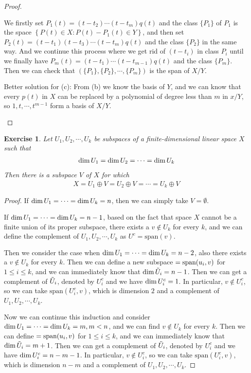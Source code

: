 \documentclass[10pt]{book}
\newtheorem{exercise}{Exercise}[section]
\theoremstyle{definition}
\numberwithin{equation}{chapter}
\begin{document}
\begin{proof}
\begin{enumerate}[label=(\alph*)]
    We firstly set $P_1(t) = (t-t_2)\cdots(t-t_m)q(t)$ and the class $\{P_1\}$ of $P_1$ is the space $\left\{P(t)\in X: P(t) - P_1(t) \in Y \right\}$, and then set $P_2(t) = (t-t_1)(t-t_3)\cdots(t-t_m)q(t)$ and the class $\{P_2 \}$ in the same way. And we continue this process where we get rid of $(t-t_i)$ in class $P_i$ until we finally have $P_m(t) = (t-t_1)\cdots(t-t_{m-1})q(t)$ and the class $\{P_m \}$. Then we can check that $( \{P_1\}, \{P_2\}, \cdots, \{P_m\})$ is the span of $X/Y$.
    
    Better solution for (c): From (b) we know the basis of $Y$, and we can know that every $p(t)$ in $X$ can be replaced by a polynomial of degree less than $m$ in $x/Y$, so $1, t, \cdots, t^{m-1}$ form a basis of $X/Y$.
\end{enumerate}
\end{proof}

\medskip

\begin{exercise}\label{ex_5}
Let $U_1,U_2,\cdots,U_k$ be subspaces of a finite-dimensional linear space $X$ such that
\begin{align*}
    {\rm dim}\,U_1 = {\rm dim}\,U_2 = \cdots = {\rm dim}\,U_k
\end{align*}
Then there is a subspace $V$ of $X$ for which
\begin{align*}
    X = U_1\oplus V = U_2\oplus V = \cdots = U_k\oplus V
\end{align*}
\end{exercise}
\begin{proof}
If ${\rm dim}\, U_1 = \cdots = {\rm dim}\, U_k = n$, then we can simply take $V = \emptyset$.

If ${\rm dim}\, U_1 = \cdots = {\rm dim}\, U_k = n-1$, based on the fact that space $X$ cannot be a finite union of its proper subspace, there exists a $v \notin U_k$ for every $k$, and we can define the complement of $U_1, U_2, \cdots, U_k$ as $U^c = \text{span}(v)$.

Then we consider the case when ${\rm dim}\, U_1 = \cdots = {\rm dim}\, U_k = n-2$, also there exists a $v \notin U_k$ for every $k$. Then we can define a new subspace $\title{\Tilde{U}_i} = \text{span}(u_i,v)$ for $1 \leq i \leq k$, and we can immediately know that ${\rm dim}\, \Tilde{U}_i = n - 1$. Then we can get a complement of $\Tilde{U}_i$, denoted by $U_i^c$ and we have ${\rm dim}\, U_i^c = 1$. In particular, $v \notin U_i^c$, so we can take $\text{span} (U_i^c, v)$, which is dimension $2$ and a complement of $U_1, U_2, \cdots, U_k$.

Now we can continue this induction and consider ${\rm dim}\, U_1 = \cdots = {\rm dim}\, U_k = m, m < n$, and we can find $v \notin U_k$ for every $k$. Then we can define $\title{\Tilde{U}_i} = \text{span}(u_i,v)$ for $1 \leq i \leq k$, and we can immediately know that ${\rm dim}\, \Tilde{U}_i = m + 1$. Then we can get a complement of $\Tilde{U}_i$, denoted by $U_i^c$ and we have ${\rm dim}\, U_i^c = n - m - 1$. In particular, $v \notin U_i^c$, so we can take $\text{span} (U_i^c, v)$, which is dimension $n - m$ and a complement of $U_1, U_2, \cdots, U_k$.
\end{proof}
\end{document}
